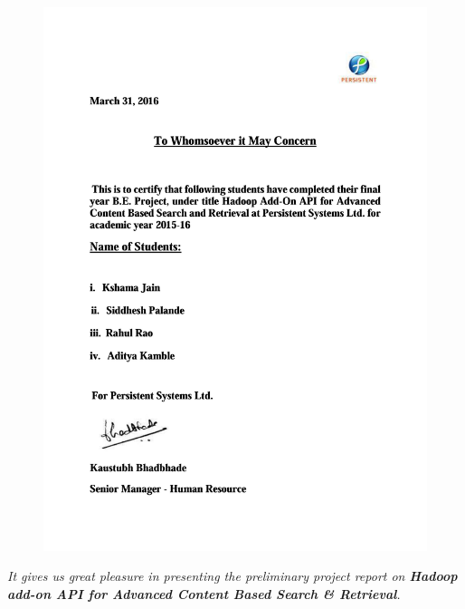 \documentclass[oneside,a4paper,12pt]{report}
\begin{document}
{   \setlength{\parindent}{11mm} }
\begin{center}
	\begin{figure}[!htbp]
		\centering
		\includegraphics[width=\textwidth]{completion-letter-3}
	\end{figure}
\end{center}


{   \setlength{\parindent}{11mm} }
{ \setlength{\parindent}{0mm} }
\textit{It gives us great pleasure in presenting the preliminary project report 
on {\bfseries \fontsize{12}{12} \selectfont Hadoop add-on API for Advanced Content Based Search \& Retrieval}.}
\vspace*{1.5\baselineskip}
\end{document}

